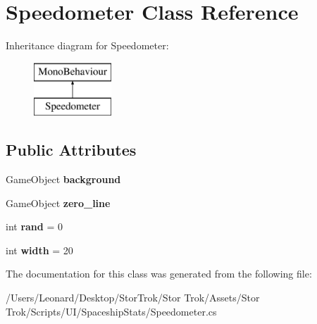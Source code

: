 \hypertarget{class_speedometer}{}\section{Speedometer Class Reference}
\label{class_speedometer}
Inheritance diagram for Speedometer\+:\begin{figure}[H]
\begin{center}
\leavevmode
\includegraphics[height=2.000000cm]{class_speedometer}
\end{center}
\end{figure}
\subsection*{Public Attributes}
\begin{DoxyCompactItemize}
\item 
\mbox{\label{class_speedometer_ab77e72a964def63857842987d9797640}} 
Game\+Object {\bfseries background}
\item 
\mbox{\label{class_speedometer_ad1e3f5ac9eb7ce65d8c9eff7bf9856d2}} 
Game\+Object {\bfseries zero\+\_\+line}
\item 
\mbox{\label{class_speedometer_a5d6f83f779122979370193c52619a806}} 
int {\bfseries rand} = 0
\item 
\mbox{\label{class_speedometer_af3bc5ba3da97b2a9ab1dc5877dec2d2e}} 
int {\bfseries width} = 20
\end{DoxyCompactItemize}


The documentation for this class was generated from the following file\+:\begin{DoxyCompactItemize}
\item 
/\+Users/\+Leonard/\+Desktop/\+Stor\+Trok/\+Stor Trok/\+Assets/\+Stor Trok/\+Scripts/\+U\+I/\+Spaceship\+Stats/Speedometer.\+cs\end{DoxyCompactItemize}
